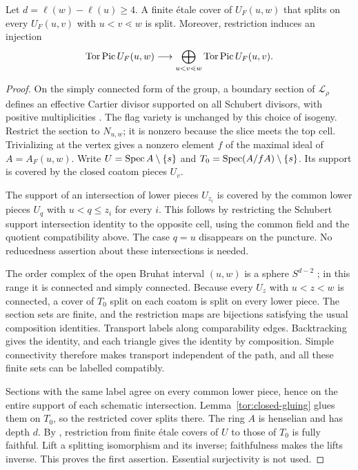 \begin{theorem}\label{tor:boundary}
Let $d=\ell(w)-\ell(u)\ge4$. A finite \'etale cover of $U_F(u,w)$ that splits on every $U_F(u,v)$ with $u<v\lessdot w$ is split. Moreover, restriction induces an injection
\begin{equation}\label{tor:boundary-injection}
 \operatorname{Tor}\operatorname{Pic} U_F(u,w)\longrightarrow
 \bigoplus_{u<v\lessdot w}\operatorname{Tor}\operatorname{Pic} U_F(u,v).
\end{equation}
\end{theorem}
\begin{proof}
On the simply connected form of the group, a boundary section of $\mathcal L_\rho$ defines an effective Cartier divisor supported on all Schubert divisors, with positive multiplicities \cite{AS14}. The flag variety is unchanged by this choice of isogeny. Restrict the section to $N_{u,w}$; it is nonzero because the slice meets the top cell. Trivializing at the vertex gives a nonzero element $f$ of the maximal ideal of $A=A_F(u,w)$. Write $U=\operatorname{Spec} A\setminus\{s\}$ and $T_0=\operatorname{Spec}(A/fA)\setminus\{s\}$. Its support is covered by the closed coatom pieces $U_v$.

The support of an intersection of lower pieces $U_{z_i}$ is covered by the common lower pieces $U_q$ with $u<q\le z_i$ for every $i$. This follows by restricting the Schubert support intersection identity to the opposite cell, using the common field and the quotient compatibility above. The case $q=u$ disappears on the puncture. No reducedness assertion about these intersections is needed.

The order complex of the open Bruhat interval $(u,w)$ is a sphere $S^{d-2}$ \cite{BW82}; in this range it is connected and simply connected. Because every $U_z$ with $u<z<w$ is connected, a cover of $T_0$ split on each coatom is split on every lower piece. The section sets are finite, and the restriction maps are bijections satisfying the usual composition identities. Transport labels along comparability edges. Backtracking gives the identity, and each triangle gives the identity by composition. Simple connectivity therefore makes transport independent of the path, and all these finite sets can be labelled compatibly.

Sections with the same label agree on every common lower piece, hence on the entire support of each schematic intersection. Lemma~\ref{tor:closed-gluing} glues them on $T_0$, so the restricted cover splits there. The ring $A$ is henselian and has depth $d$. By \cite[Tag~0BLJ]{The26}, restriction from finite \'etale covers of $U$ to those of $T_0$ is fully faithful. Lift a splitting isomorphism and its inverse; faithfulness makes the lifts inverse. This proves the first assertion. Essential surjectivity is not used.


\end{proof}
